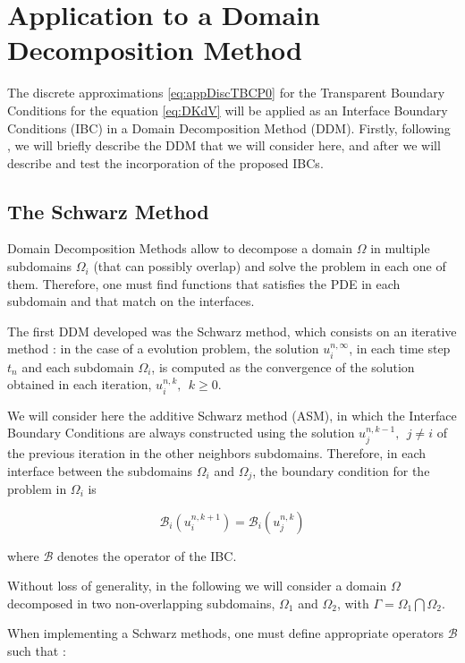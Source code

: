\section{Application to a Domain Decomposition Method}

\indent The discrete approximations \eqref{eq:appDiscTBCP0} for the Transparent Boundary Conditions for the equation \eqref{eq:DKdV} will be applied as an Interface Boundary Conditions (IBC) in a Domain Decomposition Method (DDM). Firstly, following \cite{Japhet2003}, we will briefly describe the DDM that we will consider here, and after we will describe and test the incorporation of the proposed IBCs.

\subsection{The Schwarz Method}

\indent Domain Decomposition Methods allow to decompose a domain $\Omega$ in multiple subdomains $\Omega_i$ (that can possibly overlap) and solve the problem in each one of them. Therefore, one must find functions that satisfies the PDE in each subdomain and that match on the interfaces. 

\indent The first DDM developed was the Schwarz method, which consists on an iterative method : in the case of a evolution problem, the solution  $u_i^{n,\infty}$, in each time step $t_n$ and each subdomain $\Omega_i$, is computed as the convergence of the solution obtained in each iteration, $u_i^{n,k}, \ \ k\geq 0$. 

\indent We will consider here the additive Schwarz method (ASM), in which the Interface Boundary Conditions are always constructed using the solution $u_j^{n,k-1}, \ \ j \neq i$ of the previous iteration in the other neighbors subdomains. Therefore, in each interface between the subdomains $\Omega_i$ and $\Omega_j$, the boundary condition for the problem in $\Omega_i$ is

$$\mathcal{B}_i(u_i^{n,k+1}) = \mathcal{B}_i(u_j^{n,k})$$

\noindent where $\mathcal{B}$ denotes the operator of the IBC.

\indent Without loss of generality, in the following we will consider a domain $\Omega$ decomposed in two non-overlapping subdomains, $\Omega_1$ and $\Omega_2$, with $\Gamma = \Omega_1 \bigcap \Omega_2$.

\indent When implementing a Schwarz methods, one must define appropriate operators $\mathcal{B}$ such that :

